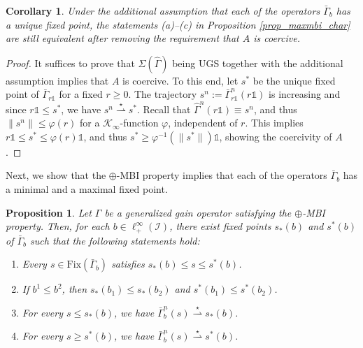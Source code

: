 \documentclass[10pt, oneside, a4paper]{article}
\newcommand{\unit}{\mathds{1}}
\newcommand{\Fix}{\mathrm{Fix}}
\newcommand{\IC}{\mathcal{I}}
\newcommand{\KC}{\mathcal{K}}
\newcommand{\bsign}[1]{\bar{#1}}
\newtheorem{proposition}{Proposition}[section]
\newtheorem{corollary}{Corollary}[section]
\begin{document}
\begin{corollary}\label{cor_unique_fp}
Under the additional assumption that each of the operators $\bsign{\Gamma}_b$ has a unique fixed point, the statements (a)--(c) in Proposition \ref{prop_maxmbi_char} are still equivalent after removing the requirement that $A$ is coercive.
\end{corollary}

\begin{proof}
It suffices to prove that $\Sigma(\hat{\Gamma})$ being UGS together with the additional assumption implies that $A$ is coercive. To this end, let $s^*$ be the unique fixed point of $\bsign{\Gamma}_{r\unit}$ for a fixed $r \geq 0$. The trajectory $s^n := \bsign{\Gamma}_{r\unit}^n(r\unit)$ is increasing and since $r\unit \leq s^*$, we have $s^n \stackrel{\star}{\rightharpoonup} s^*$. Recall that $\hat{\Gamma}^n(r\unit) \equiv s^n$, and thus $\|s^n\| \leq \varphi(r)$ for a $\KC_{\infty}$-function $\varphi$, independent of $r$. This implies $r\unit \leq s^* \leq \varphi(r)\unit$, and thus $s^* \geq \varphi^{-1}(\|s^*\|)\unit$, showing the coercivity of $A$.
\end{proof}

Next, we show that the $\oplus$-MBI property implies that each of the operators $\bsign{\Gamma}_b$ has a minimal and a maximal fixed point.%

\begin{proposition}\label{prop_min_max_fixed_points}
Let $\Gamma$ be a generalized gain operator satisfying the $\oplus$-MBI property. Then, for each $b \in \ell^{\infty}_+(\IC)$, there exist fixed points $s_*(b)$ and $s^*(b)$ of $\bsign{\Gamma}_b$ such that the following statements hold:%
\begin{enumerate}
\item[(a)] Every $s \in \Fix(\bsign{\Gamma}_b)$ satisfies $s_*(b) \leq s \leq s^*(b)$.%
\item[(b)] If $b^1 \leq b^2$, then $s_*(b_1) \leq s_*(b_2)$ and $s^*(b_1) \leq s^*(b_2)$.%
\item[(c)] For every $s \leq s_*(b)$, we have $\bsign{\Gamma}_b^n(s) \stackrel{\star}{\rightharpoonup} s_*(b)$.%
\item[(d)] For every $s \geq s^*(b)$, we have $\bsign{\Gamma}_b^n(s) \stackrel{\star}{\rightharpoonup} s^*(b)$.
\end{enumerate}
\end{proposition}
\end{document}
